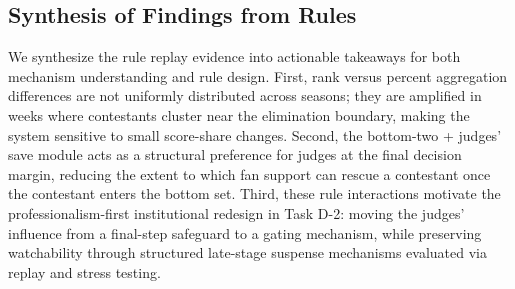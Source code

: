 \subsection{Synthesis of Findings from Rules}\label{subsec:synthesis_of_findings_from_rules}

We synthesize the rule replay evidence into actionable takeaways for both mechanism understanding and rule design.
First, rank versus percent aggregation differences are not uniformly distributed across seasons; they are amplified in weeks where contestants cluster near the elimination boundary, making the system sensitive to small score-share changes.
Second, the bottom-two + judges' save module acts as a structural preference for judges at the final decision margin, reducing the extent to which fan support can rescue a contestant once the contestant enters the bottom set.
Third, these rule interactions motivate the professionalism-first institutional redesign in Task D-2: moving the judges' influence from a final-step safeguard to a gating mechanism, while preserving watchability through structured late-stage suspense mechanisms evaluated via replay and stress testing.







